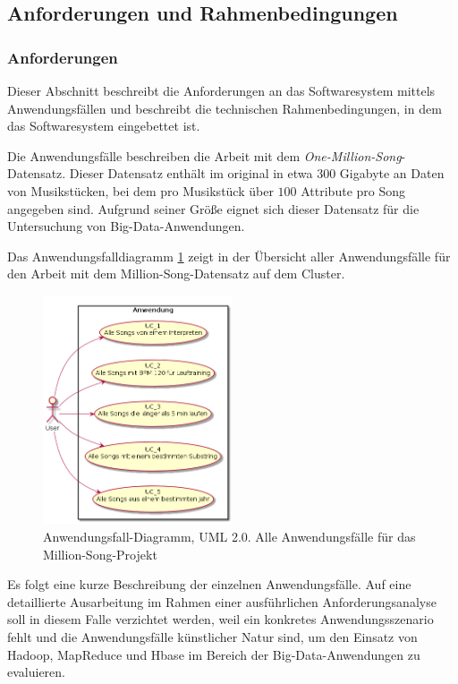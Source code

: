 \subsection{Anforderungen und Rahmenbedingungen}
\subsubsection{Anforderungen}
Dieser Abschnitt beschreibt die Anforderungen an das Softwaresystem mittels Anwendungsfällen und 
beschreibt die technischen Rahmenbedingungen, in dem das Softwaresystem eingebettet ist.

Die Anwendungsfälle beschreiben die Arbeit mit dem \textit{One-Million-Song}-Datensatz. Dieser Datensatz
enthält im original in etwa $300$ Gigabyte an Daten von Musikstücken, bei dem pro Musikstück über $100$ Attribute pro Song
angegeben sind. Aufgrund seiner Größe eignet sich dieser Datensatz für die Untersuchung von
Big-Data-Anwendungen.

Das Anwendungsfalldiagramm \ref{anforderungen:usecasediagramm} zeigt in  der Übersicht aller Anwendungsfälle für
den Arbeit mit dem Million-Song-Datensatz auf dem Cluster.

\begin{figure}
	\centering
	\includegraphics[width=0.5\textwidth]{images/useCaseDiagramm.png}
	\caption{Anwendungsfall-Diagramm, UML 2.0. Alle Anwendungsfälle für das Million-Song-Projekt}
	\label{anforderungen:usecasediagramm}
\end{figure}

Es folgt eine kurze Beschreibung der einzelnen Anwendungsfälle. Auf eine detaillierte Ausarbeitung im Rahmen einer 
ausführlichen Anforderungsanalyse soll in diesem Falle verzichtet werden, weil ein konkretes Anwendungsszenario fehlt und
die Anwendungsfälle künstlicher Natur sind, um den Einsatz von Hadoop, MapReduce und Hbase im Bereich der
Big-Data-Anwendungen zu evaluieren.

